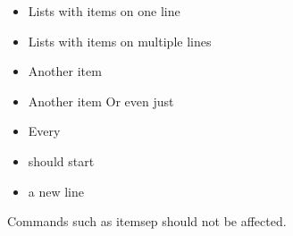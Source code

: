 \documentclass{article}
\begin{document}
\begin{itemize}

\item Lists with items on one line

\item Lists with items
on multiple lines

\item Another item

\item Another item
Or even just %

\item Every \item should start \item a new line

\end{itemize}

Commands such as itemsep should not be affected.
\setlength{\itemsep}{0pt}
\end{document}
